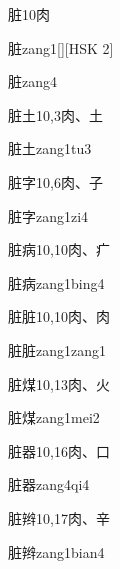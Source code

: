 \begin{entry}{脏}{10}{⾁}
  \begin{phonetics}{脏}{zang1}[][HSK 2]
  \end{phonetics}
  \begin{phonetics}{脏}{zang4}
  \end{phonetics}
\end{entry}

\begin{entry}{脏土}{10,3}{⾁、⼟}
  \begin{phonetics}{脏土}{zang1tu3}
  \end{phonetics}
\end{entry}

\begin{entry}{脏字}{10,6}{⾁、⼦}
  \begin{phonetics}{脏字}{zang1zi4}
  \end{phonetics}
\end{entry}

\begin{entry}{脏病}{10,10}{⾁、⽧}
  \begin{phonetics}{脏病}{zang1bing4}
  \end{phonetics}
\end{entry}

\begin{entry}{脏脏}{10,10}{⾁、⾁}
  \begin{phonetics}{脏脏}{zang1zang1}
  \end{phonetics}
\end{entry}

\begin{entry}{脏煤}{10,13}{⾁、⽕}
  \begin{phonetics}{脏煤}{zang1mei2}
  \end{phonetics}
\end{entry}

\begin{entry}{脏器}{10,16}{⾁、⼝}
  \begin{phonetics}{脏器}{zang4qi4}
  \end{phonetics}
\end{entry}

\begin{entry}{脏辫}{10,17}{⾁、⾟}
  \begin{phonetics}{脏辫}{zang1bian4}
  \end{phonetics}
\end{entry}

